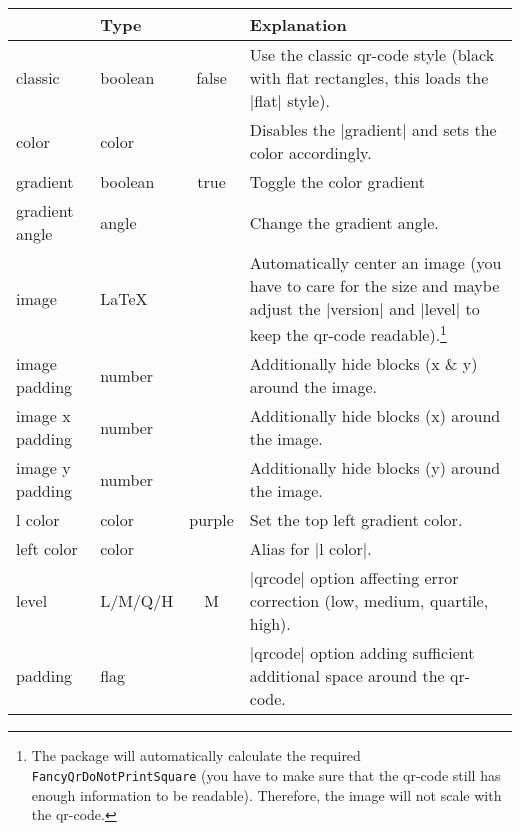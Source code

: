 \documentclass[parskip=half,english,numbers=noenddot,footnotes=nomultiple,oneside]{scrartcl}
\def\ltx#1{\lstinline/#1/}
\begin{document}
\begin{savenotes}
\begin{table}
	\centering\begin{tabular}{>{\ttfamily}ll>{\ttfamily}cp{.5\linewidth}}
		\toprule
		\multicolumn{1}{l}{Option} & Type & \multicolumn{1}{c}{Default} & Explanation \\
		\midrule
		classic         & boolean &   false  & Use the classic qr-code style (black with flat rectangles, this loads the |flat| style).                                \\
		color           & color   &          & Disables the |gradient| and sets the color accordingly.      \\
		gradient        & boolean &   true   & Toggle the color gradient                                    \\
		gradient angle  & angle   &  135     & Change the gradient angle.                                   \\
		image           & \LaTeX   &          & Automatically center an image (you have to care for the size and maybe adjust the |version| and |level| to keep the qr-code readable).\footnote{The package will automatically calculate the required \ltx{\\FancyQrDoNotPrintSquare} (you have to make sure that the qr-code still has enough information to be readable). Therefore, the image will not scale with the qr-code.} \\
		image padding   & number  &          & Additionally hide blocks (x \& y) around the image.          \\
		image x padding & number  &   0      & Additionally hide blocks (x) around the image.               \\
		image y padding & number  &   0      & Additionally hide blocks (y) around the image.               \\
		l color         & color   & purple   & Set the top left gradient color.                             \\
		left color      & color   &          & Alias for |l color|.                                         \\
		level 			 & L/M/Q/H &   M      & |qrcode| option affecting error correction (low, medium, quartile, high).                                     \\
		padding         & flag    &          & |qrcode| option adding sufficient additional space around the qr-code.                                            \\

\end{tabular}
\end{table}
\end{savenotes}
\end{document}
